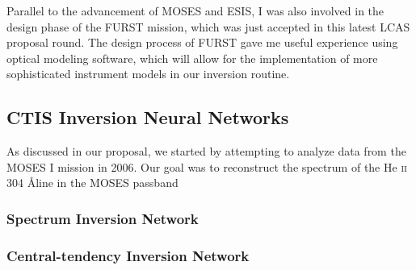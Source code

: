 \documentclass[10pt,letterpaper]{article}
\begin{document}
		Parallel to the advancement of MOSES and ESIS, I was also involved in the design phase of the FURST mission, which was just accepted in this latest LCAS proposal round.
		The design process of FURST gave me useful experience using optical modeling software, which will allow for the implementation of more sophisticated instrument models in our inversion routine.
	
		\subsection{CTIS Inversion Neural Networks}
		
			As discussed in our proposal, we started by attempting to analyze data from the MOSES I mission in 2006.
			Our goal was to reconstruct the spectrum of the He \textsc{ii} 304 \AA line in the MOSES passband 
			
			
			\subsubsection{Spectrum Inversion Network}
			
				
			
			\subsubsection{Central-tendency Inversion Network}
			
\end{document}
